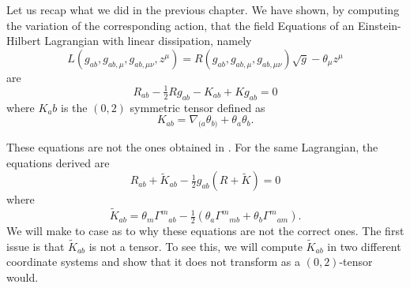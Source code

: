\documentclass[../main.tex]{subfiles}
\begin{document}
Let us recap what we did in the previous chapter. We have shown, by computing the
variation of the corresponding action, that the field Equations of an Einstein-Hilbert
Lagrangian with linear dissipation, namely
\begin{equation} 
	L(g_{ab}, g_{ab,\mu}, g_{ab,\mu\nu}, z^\mu) = R(g_{ab}, g_{ab,\mu}, g_{ab,\mu\nu})
	\sqrt{g} - \theta_\mu z^\mu
\end{equation}
are
\begin{equation} 
	R_{ab} - \tfrac{1}{2}Rg_{ab} - K_{ab} + Kg_{ab} = 0
\end{equation}
where \( K_ab \) is the \( (0,2) \) symmetric tensor defined as
\begin{equation}
	K_{ab} = \nabla_{(a}\theta_{b)} + \theta_a\theta_b. 
\end{equation}

These equations are not the ones obtained in \cite{Lazo2017}. For the same Lagrangian, the
equations derived are
\begin{equation} \label{eq:EFE lazo}
	R_{ab} + \tilde{K}_{ab} - \tfrac{1}{2}g_{ab}(R + \tilde{K}) = 0
\end{equation}
where
\begin{equation} \label{eq:}
	\tilde{K}_{ab} = \theta_m {\Gamma^m}_{ab} - \tfrac{1}{2}\left(\theta_a {\Gamma^m}_{mb} +
	\theta_b {\Gamma^m}_{am}\right). 
\end{equation}
We will make to case as to why these equations are not the correct ones. The first issue
is that \( \tilde{K}_{ab} \) is not a tensor. To see this, we will compute \(
\tilde{K}_{ab} \) in two different coordinate systems and show that it does not transform
as a \( (0,2) \)-tensor would. 
\end{document}
